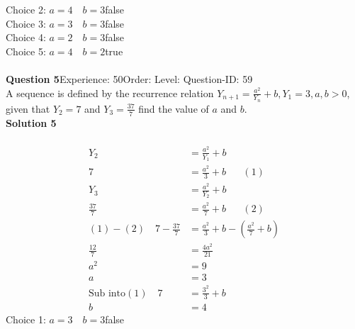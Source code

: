 \documentclass{article}
\begin{document}
Choice 2: \hspace{20pt}$a=4\quad b=3$\hspace{20pt}false\\
Choice 3: \hspace{20pt}$a=3\quad b=3$\hspace{20pt}false\\
Choice 4: \hspace{20pt}$a=2\quad b=3$\hspace{20pt}false\\
Choice 5: \hspace{20pt}$a=4\quad b=2$\hspace{20pt}true\\
\\[4pt]
\noindent\textbf{Question 5}\hspace{20pt}Experience: 50\hspace{20pt}Order: \hspace{20pt}Level: \hspace{20pt}Question-ID: 59\\[2pt]
A sequence is defined by the recurrence relation $Y_{n+1}=\displaystyle\frac{a^2}{Y_n}+b, Y_1=3, a,b>0$, given that $Y_2=7$ and $Y_3=\displaystyle\frac{37}{7}$ find the value of $a$ and $b$.\\[4pt]
\noindent\textbf{Solution 5}\\[2pt]
\\[-35pt]\begin{align*}
Y_2&=\displaystyle\frac{a^2}{Y_1}+b\\[2pt]
7&=\displaystyle\frac{a^2}{3}+b\hspace{20pt}(1)\\[12pt]
Y_3&=\displaystyle\frac{a^2}{Y_2}+b\\[2pt]
\displaystyle\frac{37}{7}&=\displaystyle\frac{a^2}{7}+b\hspace{20pt}(2)\\[2pt]
(1)-(2)\quad 7-\displaystyle\frac{37}{7}&=\frac{a^2}{3}+b-\left(\frac{a^2}{7}+b\right)\\[2pt]
\displaystyle\frac{12}{7}&=\displaystyle\frac{4a^2}{21}\\[2pt]
a^2&=9\\[2pt]
a&=3\\[12pt]
\text{Sub into} (1)\quad 7&=\displaystyle\frac{3^2}{3}+b\\[2pt]
b&=4
\end{align*}
Choice 1: \hspace{20pt}$a=3\quad b=3$\hspace{20pt}false\\
\end{document}
